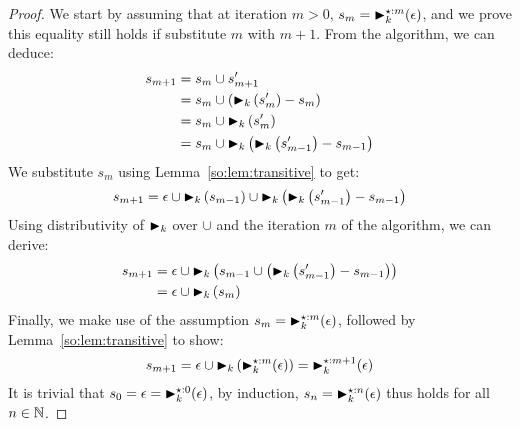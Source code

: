 \begin{proof}
    We start by assuming that at iteration $m > 0$, $s_m =
    \operatorname{\blacktriangleright}^{\star:m}_k(\epsilon)$, and we prove this equality still holds if
    substitute $m$ with $m + 1$.  From the algorithm, we can deduce:
    \begin{equation*}
    \begin{aligned}
        s_{m+1}
         &= s_m \cup s^\prime_{m+1} \\
         &= s_m \cup \left( \operatorname{\blacktriangleright}_k \left( s^\prime_m \right) - s_m \right) \\
         &= s_m \cup \operatorname{\blacktriangleright}_k \left( s^\prime_m \right) \\
         &= s_m \cup \operatorname{\blacktriangleright}_k \left(
                \operatorname{\blacktriangleright}_k \left( s^\prime_{m-1} \right) - s_{m-1}
            \right)
    \end{aligned}
    \end{equation*}
    We substitute $s_m$ using Lemma~\ref{so:lem:transitive} to get:
    \begin{equation*}
        s_{m+1}
          = \epsilon \cup \operatorname{\blacktriangleright}_k \left( s_{m-1} \right) \cup
            \operatorname{\blacktriangleright}_k \left(
                \operatorname{\blacktriangleright}_k \left( s^\prime_{m-1} \right) - s_{m-1}
            \right)
    \end{equation*}
    Using distributivity of $\operatorname{\blacktriangleright}_k$ over $\cup$ and the iteration $m$ of
    the algorithm, we can derive:
    \begin{equation*}
    \begin{aligned}
        s_{m+1}
         &= \epsilon \cup \operatorname{\blacktriangleright}_k \left(
                s_{m-1} \cup \left(
                    \operatorname{\blacktriangleright}_k \left( s^\prime_{m-1} \right) - s_{m-1}
                \right)
            \right) \\
         &= \epsilon \cup \operatorname{\blacktriangleright}_k \left( s_m \right)
    \end{aligned}
    \end{equation*}
    Finally, we make use of the assumption $s_m =
    \operatorname{\blacktriangleright}^{\star:m}_k(\epsilon)$, followed by Lemma~\ref{so:lem:transitive}
    to show:
    \begin{equation*}
        s_{m+1}
        = \epsilon \cup \operatorname{\blacktriangleright}_k \left(
            \operatorname{\blacktriangleright}^{\star:m}_k(\epsilon)
        \right)
        = \operatorname{\blacktriangleright}^{\star:m+1}_k(\epsilon)
    \end{equation*}
    It is trivial that $s_0 = \epsilon = \operatorname{\blacktriangleright}^{\star:0}_k(\epsilon)$, by
    induction, $s_n = \operatorname{\blacktriangleright}^{\star:n}_k(\epsilon)$ thus holds for all $n \in
    \mathbb{N}$.
\end{proof}

